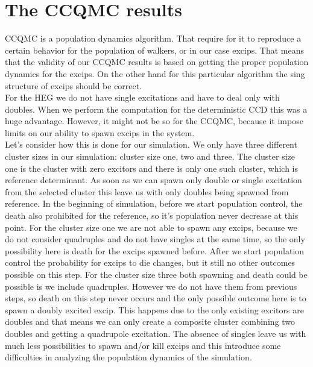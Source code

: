 \section{The CCQMC results}
CCQMC is a population dynamics algorithm. That require for it to reproduce a certain behavior for the population of walkers, or in our case excips. That means that the validity of our CCQMC results is based on getting the proper population dynamics for the excips. On the other hand for this particular algorithm the sing structure of excips should be correct. \\
For the HEG we do not have single excitations and have to deal only with doubles. When we perform the computation for the deterministic CCD this was a huge advantage. However, it might not be so for the CCQMC, because it impose limits on our ability to spawn excips in the system. \\
Let's consider how this is done for our simulation. We only have three different cluster sizes in our simulation: cluster size one, two and three. The cluster size one is the cluster with zero excitors and there is only one such cluster, which is reference determinant. As soon as we can spawn only double or single excitation from the selected cluster this leave us with only doubles being spawned from reference. In the beginning of simulation, before we start population control, the death also prohibited for the reference, so it's population never decrease at this point. For the cluster size one we are not able to spawn any excips, because we do not consider quadruples and do not have singles at the same time, so the only possibility here is death for the excips spawned before. After we start population control the probability for excips to die changes, but it still no other outcomes possible on this step. For the cluster size three both spawning and death could be possible is we include quadruples. However we do not have them from previous steps, so death on this step never occurs and the only possible outcome here is to spawn a doubly excited excip. This happens due to the only existing excitors are doubles and that means we can only create a composite cluster combining two doubles and getting a quadrupole excitation. The absence of singles leave us with much less possibilities to spawn and/or kill excips and this introduce some difficulties in analyzing the population dynamics of the simulation.\\
